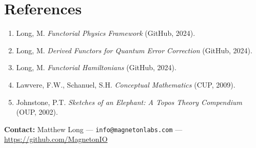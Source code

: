 \documentclass[11pt]{article}
\begin{document}
\section*{References}
\begin{enumerate}
\item Long, M. \emph{Functorial Physics Framework} (GitHub, 2024).
\item Long, M. \emph{Derived Functors for Quantum Error Correction} (GitHub, 2024).
\item Long, M. \emph{Functorial Hamiltonians} (GitHub, 2024).
\item Lawvere, F.W., Schanuel, S.H. \emph{Conceptual Mathematics} (CUP, 2009).
\item Johnstone, P.T. \emph{Sketches of an Elephant: A Topos Theory Compendium} (OUP, 2002).
\end{enumerate}

\vspace{1em}
\noindent\textbf{Contact:} Matthew Long — \texttt{info@magnetonlabs.com} — \url{https://github.com/MagnetonIO}
\end{document}
